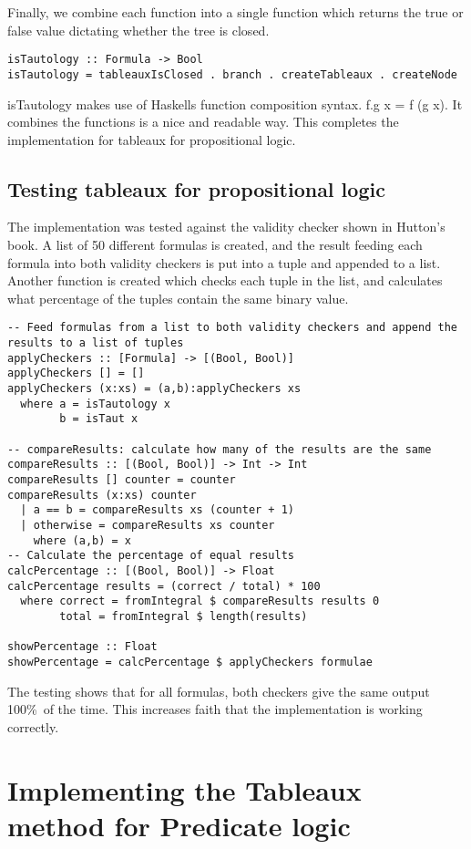 \documentclass{article}%
\begin{document}
Finally, we combine each function into a single function which returns the true or false value dictating whether the tree is closed.
\begin{verbatim}
isTautology :: Formula -> Bool 
isTautology = tableauxIsClosed . branch . createTableaux . createNode
\end{verbatim}
 isTautology makes use of Haskells function composition syntax. f.g x = f (g x). It combines the functions is a nice and readable way. This completes the implementation for tableaux for propositional logic. 
\subsection{Testing tableaux for propositional logic}
The implementation was tested against the validity checker shown in Hutton's book. A list of 50 different formulas is created, and the result feeding each formula into both validity checkers is put into a tuple and appended to a list. Another function is created which checks each tuple in the list, and calculates what percentage of the tuples contain the same binary value. 

\begin{verbatim}
-- Feed formulas from a list to both validity checkers and append the results to a list of tuples
applyCheckers :: [Formula] -> [(Bool, Bool)]
applyCheckers [] = []
applyCheckers (x:xs) = (a,b):applyCheckers xs
  where a = isTautology x 
        b = isTaut x

-- compareResults: calculate how many of the results are the same
compareResults :: [(Bool, Bool)] -> Int -> Int
compareResults [] counter = counter
compareResults (x:xs) counter 
  | a == b = compareResults xs (counter + 1)
  | otherwise = compareResults xs counter
    where (a,b) = x
-- Calculate the percentage of equal results
calcPercentage :: [(Bool, Bool)] -> Float 
calcPercentage results = (correct / total) * 100
  where correct = fromIntegral $ compareResults results 0
        total = fromIntegral $ length(results)

showPercentage :: Float 
showPercentage = calcPercentage $ applyCheckers formulae
\end{verbatim}
The testing shows that for all formulas, both checkers give the same output 100\%\ of the time. This increases faith that the implementation is working correctly. 
\section{Implementing the Tableaux method for Predicate logic}
\end{document}
